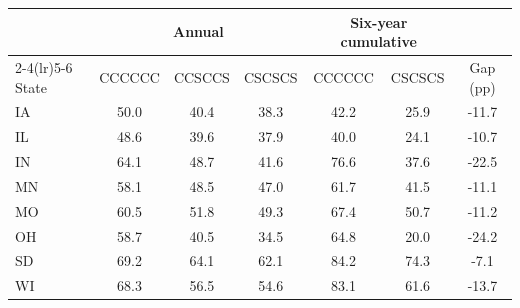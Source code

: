 \begin{tabular}{lcccccc}
\toprule
& \multicolumn{3}{c}{Annual} & \multicolumn{2}{c}{Six-year cumulative} & \\
\cmidrule(lr){2-4}\cmidrule(lr){5-6}
State & CCCCCC & CCSCCS & CSCSCS & CCCCCC & CSCSCS & Gap (pp)\\
\midrule
IA & 50.0 & 40.4 & 38.3 & 42.2 & 25.9 & -11.7 \\
IL & 48.6 & 39.6 & 37.9 & 40.0 & 24.1 & -10.7 \\
IN & 64.1 & 48.7 & 41.6 & 76.6 & 37.6 & -22.5 \\
MN & 58.1 & 48.5 & 47.0 & 61.7 & 41.5 & -11.1 \\
MO & 60.5 & 51.8 & 49.3 & 67.4 & 50.7 & -11.2 \\
OH & 58.7 & 40.5 & 34.5 & 64.8 & 20.0 & -24.2 \\
SD & 69.2 & 64.1 & 62.1 & 84.2 & 74.3 & -7.1 \\
WI & 68.3 & 56.5 & 54.6 & 83.1 & 61.6 & -13.7 \\
\bottomrule
\end{tabular}
